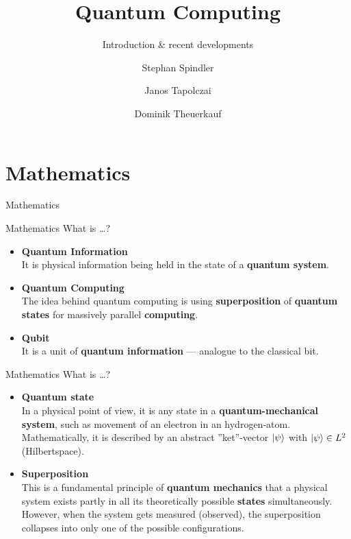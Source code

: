 \documentclass{beamer}
\title{Quantum Computing}
\subtitle{Introduction \& recent developments}
\author{Stephan Spindler \and Janos Tapolczai \and Dominik Theuerkauf}
\newcommand{\chapterframe}[1]{\begin{frame}\centering\huge{#1}\end{frame}}
\begin{document}
\begin{frame}
\titlepage
\end{frame}


\section{Mathematics}
\chapterframe{Mathematics}

\begin{frame}{Mathematics}
What is \dots ?
	\begin{itemize}
    	\item \textbf{Quantum Information}\\It is physical information being held in the state of a \textbf{quantum system}.
		\item \textbf{Quantum Computing}\\The idea behind quantum computing is using \textbf{superposition} of \textbf{quantum states} for massively parallel \textbf{computing}. 
        \item \textbf{Qubit}\\It is a unit of \textbf{quantum information} --- analogue to the classical bit.
	\end{itemize}
\end{frame}

\begin{frame}{Mathematics}
What is \dots ?
	\begin{itemize}
    	\item \textbf{Quantum state}\\In a physical point of view, it is any state in a \textbf{quantum-\-mechanical system}, such as movement of an electron in an hydrogen-atom. Mathematically, it is described by an abstract ''ket''-vector $\ket{\psi}$ with $\ket{\psi} \in L^2$ (Hilbertspace).
       \item \textbf{Superposition}\\This is a fundamental principle of \textbf{quantum mechanics} that a physical system exists partly in all its theoretically possible \textbf{states} simultaneously. However, when the system gets measured (observed), the superposition collapses into only one of the possible configurations. 
    \end{itemize}
\end{frame}
\end{document}
